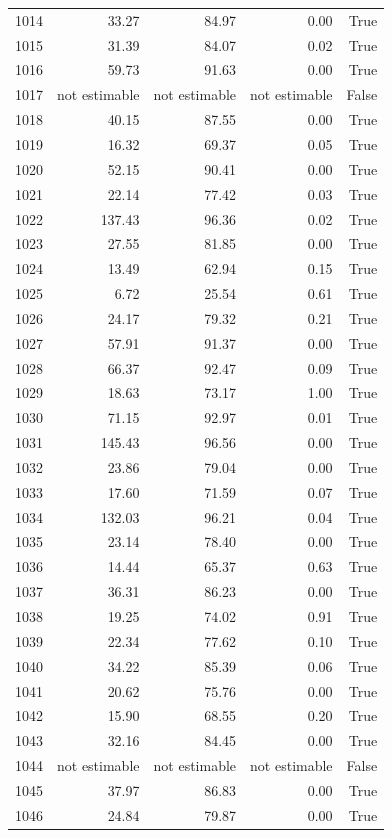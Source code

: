 \begin{longtable}{rrrrr}
1014 & 33.27 & 84.97 & 0.00 & True \\
1015 & 31.39 & 84.07 & 0.02 & True \\
1016 & 59.73 & 91.63 & 0.00 & True \\
1017 & not estimable & not estimable & not estimable & False \\
1018 & 40.15 & 87.55 & 0.00 & True \\
1019 & 16.32 & 69.37 & 0.05 & True \\
1020 & 52.15 & 90.41 & 0.00 & True \\
1021 & 22.14 & 77.42 & 0.03 & True \\
1022 & 137.43 & 96.36 & 0.02 & True \\
1023 & 27.55 & 81.85 & 0.00 & True \\
1024 & 13.49 & 62.94 & 0.15 & True \\
1025 & 6.72 & 25.54 & 0.61 & True \\
1026 & 24.17 & 79.32 & 0.21 & True \\
1027 & 57.91 & 91.37 & 0.00 & True \\
1028 & 66.37 & 92.47 & 0.09 & True \\
1029 & 18.63 & 73.17 & 1.00 & True \\
1030 & 71.15 & 92.97 & 0.01 & True \\
1031 & 145.43 & 96.56 & 0.00 & True \\
1032 & 23.86 & 79.04 & 0.00 & True \\
1033 & 17.60 & 71.59 & 0.07 & True \\
1034 & 132.03 & 96.21 & 0.04 & True \\
1035 & 23.14 & 78.40 & 0.00 & True \\
1036 & 14.44 & 65.37 & 0.63 & True \\
1037 & 36.31 & 86.23 & 0.00 & True \\
1038 & 19.25 & 74.02 & 0.91 & True \\
1039 & 22.34 & 77.62 & 0.10 & True \\
1040 & 34.22 & 85.39 & 0.06 & True \\
1041 & 20.62 & 75.76 & 0.00 & True \\
1042 & 15.90 & 68.55 & 0.20 & True \\
1043 & 32.16 & 84.45 & 0.00 & True \\
1044 & not estimable & not estimable & not estimable & False \\
1045 & 37.97 & 86.83 & 0.00 & True \\
1046 & 24.84 & 79.87 & 0.00 & True \\

\end{longtable}
